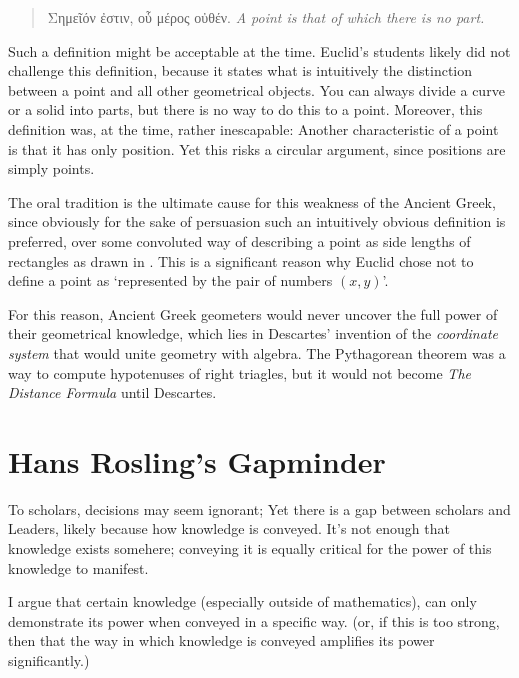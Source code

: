 \documentclass[a4paper, 12pt]{article}
\begin{document}
\begin{quote}
  \small
  \textgreek{Σημεῖόν ἐστιν, οὗ μέρος οὐθέν.}
  \hfill
  \textit{A point is that of which there is no part.}
\end{quote}

Such a definition might be acceptable at the time. Euclid's students
likely did not challenge this definition, because it states what is
intuitively the distinction between a point and all other geometrical
objects. You can always divide a curve or a solid into parts, but
there is no way to do this to a point.
Moreover, this definition was, at the time, rather inescapable: Another
characteristic of a point is that it has only position. Yet this
risks a circular argument, since positions are simply points.

The oral tradition is the ultimate cause for this weakness of
the Ancient Greek, since obviously for the sake of persuasion such an
intuitively obvious definition is preferred, over some convoluted way
of describing a point as side lengths of rectangles as drawn in
.
This is a significant reason why Euclid chose not to define a point
as `represented by the pair of numbers $(x, y)$'.

For this reason, Ancient Greek geometers would never uncover the full
power of their geometrical knowledge, which lies in Descartes' invention
of the \textit{coordinate system} that would unite geometry with algebra.
The Pythagorean theorem was a way to compute hypotenuses of right
triagles, but it would not become \textit{The Distance Formula} until
Descartes.



\section{Hans Rosling's Gapminder}
To  scholars, decisions may seem ignorant; Yet there is a gap between scholars and Leaders, likely because how knowledge is conveyed.
It's not enough that knowledge exists somehere; conveying it is equally critical for the power of this knowledge to manifest. 

I argue that certain knowledge (especially outside of mathematics), can only demonstrate its
power when conveyed in a specific way. (or, if this is too strong, then that the 
way in which knowledge is conveyed amplifies its power significantly.)
\end{document}
